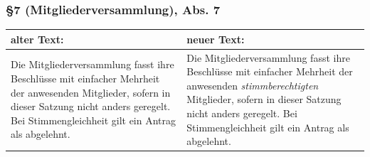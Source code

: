 \documentclass[a4paper,12pt]{scrartcl}
\begin{document}
\subsubsection*{§7 (Mitgliederversammlung), Abs. 7}
\begin{longtable}[c]{@{}ll@{}}
\toprule
\begin{minipage}[b]{0.47\columnwidth}\raggedright\strut
alter Text:
\strut\end{minipage} &
\begin{minipage}[b]{0.47\columnwidth}\raggedright\strut
neuer Text:
\strut\end{minipage}\tabularnewline
\midrule
\endhead
\begin{minipage}[t]{0.47\columnwidth}\raggedright\strut
Die Mitgliederversammlung fasst ihre Beschlüsse mit einfacher Mehrheit
der anwesenden Mitglieder, sofern in dieser Satzung nicht anders
geregelt. Bei Stimmengleichheit gilt ein Antrag als abgelehnt.
\strut\end{minipage} &
\begin{minipage}[t]{0.47\columnwidth}\raggedright\strut
Die Mitgliederversammlung fasst ihre Beschlüsse mit einfacher Mehrheit
der anwesenden \emph{stimmberechtigten} Mitglieder, sofern in dieser Satzung
nicht anders geregelt. Bei Stimmengleichheit gilt ein Antrag als
abgelehnt.
\strut\end{minipage}\tabularnewline
\bottomrule
\end{longtable}

\newpage
\end{document}
